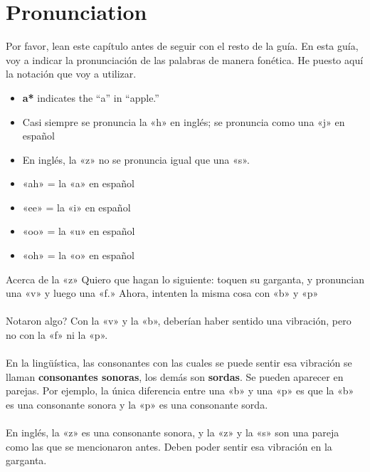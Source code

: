 \chapter{Pronunciation}

Por favor, lean este cap\'itulo antes de seguir con el resto de la gu\'ia.
En esta guía, voy a indicar la pronunciaci\'on de las palabras de manera fon\'etica.
He puesto aquí la notaci\'on que voy a utilizar.


\begin{itemize}
	\item \textbf{a*} indicates the ``a'' in ``apple.''
	\item Casi siempre se pronuncia la «h» en inglés;
			se pronuncia como una «j» en espa\~nol
	\item En inglés, la «z» no se pronuncia igual que una «s».
	\item «ah» = la «a» en espa\~nol
	\item «ee» = la «i» en espa\~nol
	\item «oo» = la «u» en espa\~nol
	\item «oh» = la «o» en espa\~nol
\end{itemize}

\begin{conf}{Acerca de la «z»}
Quiero que hagan lo siguiente: toquen su garganta, y pronuncian una «v» y luego una «f.»
	Ahora, intenten la misma cosa con «b» y «p»\\
\\
\textquestiondown Notaron algo? Con la «v» y la «b», deber\'ian haber
	sentido una vibraci\'on, pero no con la «f» ni la «p». \\
\\
En la ling\"u\'istica, las consonantes con las cuales se puede sentir esa vibraci\'on
	se llaman \textbf{consonantes sonoras}, los dem\'as son \textbf{sordas}. Se pueden
	aparecer en parejas. Por ejemplo, la \'unica diferencia entre una «b» y una «p» es
	que la «b» es una consonante sonora y la «p» es una consonante sorda.\\
\\
En ingl\'es, la «z» es una consonante sonora, y la «z» y la «s» son una pareja como las que se mencionaron antes. Deben poder sentir esa vibraci\'on en la garganta.
\end{conf}
